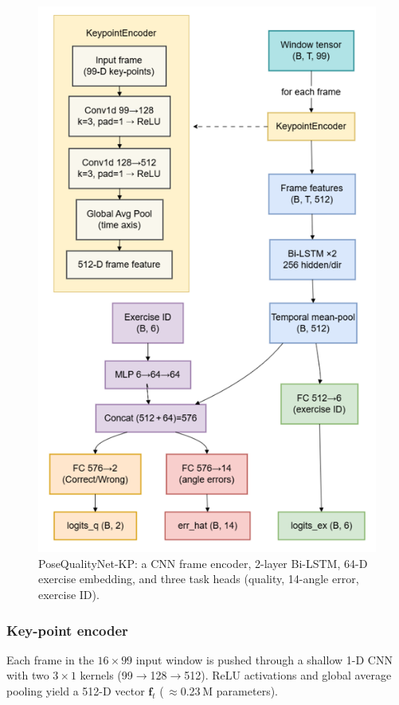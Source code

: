 \documentclass{article}
\begin{document}
\begin{figure}[t] 
  \centering
  \includegraphics[width=\linewidth]{figs/model_architecture}
  \caption{PoseQualityNet-KP: a CNN frame encoder, 2-layer Bi-LSTM,
           64-D exercise embedding, and three task heads
           (quality, 14-angle error, exercise ID).}
  \label{fig:modelflow}
  \label{fig:modelflow}
\end{figure}


\subsubsection{Key-point encoder}
Each frame in the $16\times99$ input window is pushed through a shallow
1-D CNN with two $3{\times}1$ kernels (99$\!\rightarrow$128$\!\rightarrow$512).
ReLU activations and global average pooling yield a 512-D vector
$\mathbf f_t$ (\,$\approx$0.23 M parameters).
\end{document}
